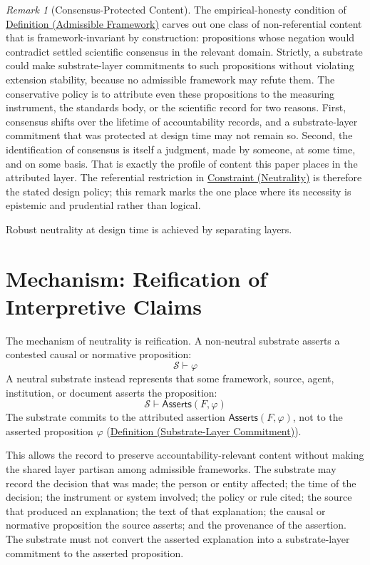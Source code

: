 \documentclass[11pt]{article}
\theoremstyle{plain}
\theoremstyle{definition}
\theoremstyle{remark}
\newtheorem{remark}[theorem]{Remark}
\newcommand{\DefRef}[2]{\hyperref[#1]{Definition (#2)}}
\newcommand{\ConstRef}[2]{\hyperref[#1]{Constraint (#2)}}
\newcommand{\Substrate}{\mathcal{S}}
\newcommand{\Framework}{F}
\newcommand{\entails}{\vdash}
\newcommand{\Asserts}{\mathsf{Asserts}}
\begin{document}
\begin{remark}[Consensus-Protected Content]
  \label{se100.remark.ConsensusProtected}
  The empirical-honesty condition of
  \DefRef{se100.def.AdmissibleFramework}{Admissible Framework} carves out one
  class of non-referential content that is framework-invariant by construction:
  propositions whose negation would contradict settled scientific consensus in
  the relevant domain.
  Strictly, a substrate could make substrate-layer commitments to such
  propositions without violating extension stability,
  because no admissible framework may refute them.
  The conservative policy is to attribute even these propositions to
  the measuring instrument, the standards body, or the scientific record
  for two reasons.
  First, consensus shifts over the lifetime of
  accountability records, and a substrate-layer commitment that was protected
  at design time may not remain so.
  Second, the identification of consensus is itself a
  judgment, made by someone, at some time, and on some basis.
  That is exactly the profile of content this paper places in the attributed layer.
  The referential restriction in
  \ConstRef{se100.constraint.Neutrality}{Neutrality} is therefore the stated
  design policy;
  this remark marks the one place where its necessity is
  epistemic and prudential rather than logical.
\end{remark}

Robust neutrality at design time is achieved by separating layers.

\section{Mechanism: Reification of Interpretive Claims}
\label{sec:mechanism}

The mechanism of neutrality is reification.
A non-neutral substrate asserts a
contested causal or normative proposition:
\[
  \Substrate \entails \varphi
\]
A neutral substrate instead represents
that some framework, source, agent,
institution, or document
asserts the proposition:
\[
  \Substrate \entails \Asserts(\Framework,\varphi)
\]
The substrate commits to the attributed assertion
$\Asserts(\Framework,\varphi)$,
not to the asserted proposition $\varphi$
(\DefRef{se100.def.SubstrateCommitment}{Substrate-Layer Commitment}).

This allows the record to preserve accountability-relevant content without
making the shared layer partisan among admissible frameworks.
The substrate may
record the decision that was made; the person or entity affected;
the time of the decision;
the instrument or system involved;
the policy or rule cited;
the source that produced an explanation;
the text of that explanation;
the causal or normative proposition the source asserts;
and the provenance of the assertion.
The substrate must not convert the asserted explanation into a
substrate-layer commitment to the asserted proposition.
\end{document}
